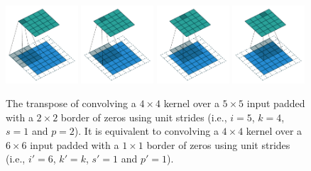 \documentclass[notitlepage]{report}
\begin{document}
\begin{figure}[p]
    \centering
    \includegraphics[width=0.24\textwidth]{pdf/arbitrary_padding_no_strides_transposed_00.pdf}
    \includegraphics[width=0.24\textwidth]{pdf/arbitrary_padding_no_strides_transposed_01.pdf}
    \includegraphics[width=0.24\textwidth]{pdf/arbitrary_padding_no_strides_transposed_02.pdf}
    \includegraphics[width=0.24\textwidth]{pdf/arbitrary_padding_no_strides_transposed_03.pdf}
    \caption{\label{fig:arbitrary_padding_no_strides_transposed} The transpose
        of convolving a $4 \times 4$ kernel over a $5 \times 5$ input padded
        with a $2 \times 2$ border of zeros using unit strides (i.e., $i = 5$,
        $k = 4$, $s = 1$ and $p = 2$). It is equivalent to convolving a $4
        \times 4$ kernel over a $6 \times 6$ input padded with a $1 \times 1$
        border of zeros using unit strides (i.e., $i' = 6$, $k' = k$, $s' = 1$
        and $p' = 1$).}
\end{figure}
\end{document}
